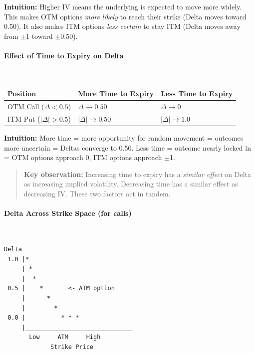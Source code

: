 \documentclass[12pt,openany]{book}
\begin{document}
\textbf{Intuition:} Higher IV means the underlying is expected to move more widely. This makes OTM options \emph{more likely} to reach their strike (Delta moves toward 0.50). It also makes ITM options \emph{less certain} to stay ITM (Delta moves away from \(\pm\)1 toward \(\pm\)0.50).

\paragraph{Effect of Time to Expiry on Delta}\mbox{}\\

\begin{center}
\scriptsize
\setlength{\tabcolsep}{3pt}
\begin{tabular}{|L{4.1cm}|L{4.1cm}|L{4.1cm}|}
\hline
\textbf{Position} & \textbf{More Time to Expiry} & \textbf{Less Time to Expiry} \\
\hline
OTM Call (\(\Delta < 0.5\)) & \(\Delta \rightarrow 0.50\) & \(\Delta \rightarrow 0\) \\
\hline
ITM Put (\(|\Delta| > 0.5\)) & \(|\Delta| \rightarrow 0.50\) & \(|\Delta| \rightarrow 1.0\) \\
\hline
\end{tabular}
\end{center}

\textbf{Intuition:} More time = more opportunity for random movement = outcomes more uncertain = Deltas converge to 0.50. Less time = outcome nearly locked in = OTM options approach 0, ITM options approach \(\pm\)1.

\begin{quote}
\textbf{Key observation:} Increasing time to expiry has a \emph{similar effect} on Delta as increasing implied volatility. Decreasing time has a similar effect as decreasing IV. These two factors act in tandem.
\end{quote}

\paragraph{Delta Across Strike Space (for calls)}\mbox{}\\

\begin{center}
\begin{Verbatim}[fontsize=\small,breaklines=true]
Delta
 1.0 |*
     | *
     |  *
 0.5 |    *       <- ATM option
     |      *
     |        *
 0.0 |          * * *
     |______________________________
       Low     ATM     High
             Strike Price
\end{Verbatim}
\end{center}
\end{document}
